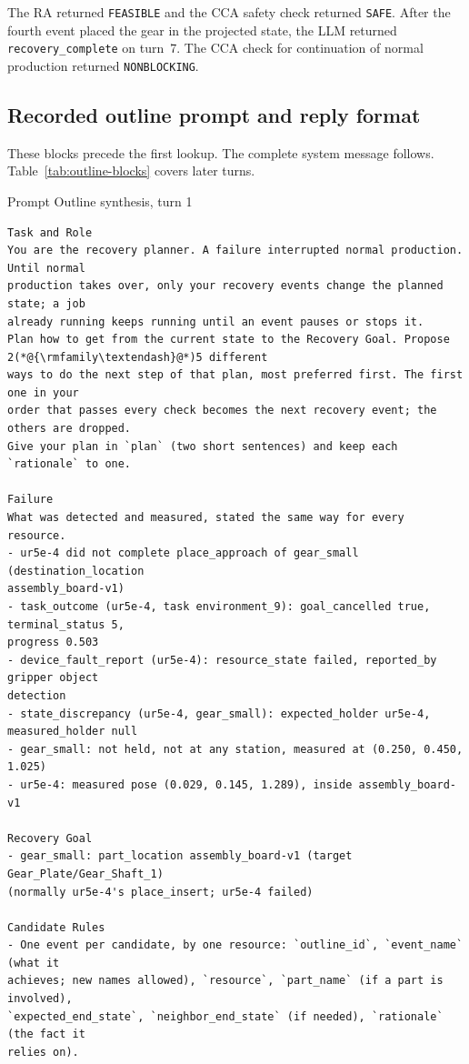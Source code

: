 \documentclass[preprint,12pt,authoryear]{elsarticle}
\let\code\nolinkurl
\begin{document}
The RA returned \code{FEASIBLE} and the CCA safety check returned \code{SAFE}.
After the fourth event placed the gear in the projected state, the LLM returned
\code{recovery_complete} on turn~7. The CCA check for continuation of normal
production returned \code{NONBLOCKING}.

\subsection{Recorded outline prompt and reply format}\label{sec:outline-prompt}

These blocks precede the first lookup. The complete system message follows.
Table~\ref{tab:outline-blocks} covers later turns.

\begin{recordbox}[breakable]{Prompt \enspace Outline synthesis, turn 1}
\begin{lstlisting}[style=recorded]
Task and Role
You are the recovery planner. A failure interrupted normal production. Until normal
production takes over, only your recovery events change the planned state; a job
already running keeps running until an event pauses or stops it.
Plan how to get from the current state to the Recovery Goal. Propose 2(*@{\rmfamily\textendash}@*)5 different
ways to do the next step of that plan, most preferred first. The first one in your
order that passes every check becomes the next recovery event; the others are dropped.
Give your plan in `plan` (two short sentences) and keep each `rationale` to one.

Failure
What was detected and measured, stated the same way for every resource.
- ur5e-4 did not complete place_approach of gear_small (destination_location
assembly_board-v1)
- task_outcome (ur5e-4, task environment_9): goal_cancelled true, terminal_status 5,
progress 0.503
- device_fault_report (ur5e-4): resource_state failed, reported_by gripper object
detection
- state_discrepancy (ur5e-4, gear_small): expected_holder ur5e-4, measured_holder null
- gear_small: not held, not at any station, measured at (0.250, 0.450, 1.025)
- ur5e-4: measured pose (0.029, 0.145, 1.289), inside assembly_board-v1

Recovery Goal
- gear_small: part_location assembly_board-v1 (target Gear_Plate/Gear_Shaft_1)
(normally ur5e-4's place_insert; ur5e-4 failed)

Candidate Rules
- One event per candidate, by one resource: `outline_id`, `event_name` (what it
achieves; new names allowed), `resource`, `part_name` (if a part is involved),
`expected_end_state`, `neighbor_end_state` (if needed), `rationale` (the fact it
relies on).


\end{lstlisting}
\end{recordbox}
\end{document}
